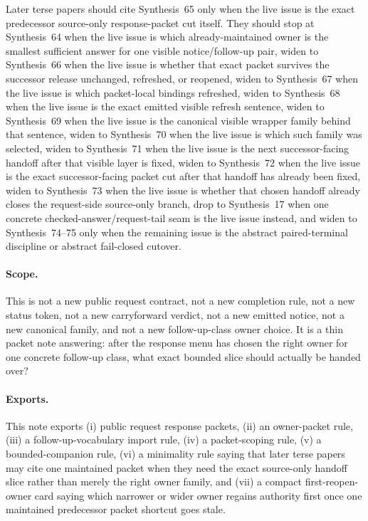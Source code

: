 \documentclass[11pt]{article}
\begin{document}
Later terse papers should cite Synthesis~65 only when the live issue is the exact predecessor source-only response-packet cut itself. They should stop at Synthesis~64 when the live issue is which already-maintained owner is the smallest sufficient answer for one visible notice/follow-up pair, widen to Synthesis~66 when the live issue is whether that exact packet survives the successor release unchanged, refreshed, or reopened, widen to Synthesis~67 when the live issue is which packet-local bindings refreshed, widen to Synthesis~68 when the live issue is the exact emitted visible refresh sentence, widen to Synthesis~69 when the live issue is the canonical visible wrapper family behind that sentence, widen to Synthesis~70 when the live issue is which such family was selected, widen to Synthesis~71 when the live issue is the next successor-facing handoff after that visible layer is fixed, widen to Synthesis~72 when the live issue is the exact successor-facing packet cut after that handoff has already been fixed, widen to Synthesis~73 when the live issue is whether that chosen handoff already closes the request-side source-only branch, drop to Synthesis~17 when one concrete checked-answer/request-tail seam is the live issue instead, and widen to Synthesis~74--75 only when the remaining issue is the abstract paired-terminal discipline or abstract fail-closed cutover.

\paragraph{Scope.}
This is not a new public request contract, not a new completion rule, not a new status token, not a new carryforward verdict, not a new emitted notice, not a new canonical family, and not a new follow-up-class owner choice.
It is a thin packet note answering: after the response menu has chosen the right owner for one concrete follow-up class, what exact bounded slice should actually be handed over?

\paragraph{Exports.}
This note exports (i) public request response packets, (ii) an owner-packet rule, (iii) a follow-up-vocabulary import rule, (iv) a packet-scoping rule, (v) a bounded-companion rule, (vi) a minimality rule saying that later terse papers may cite one maintained packet when they need the exact source-only handoff slice rather than merely the right owner family, and (vii) a compact first-reopen-owner card saying which narrower or wider owner regains authority first once one maintained predecessor packet shortcut goes stale.
\end{document}
